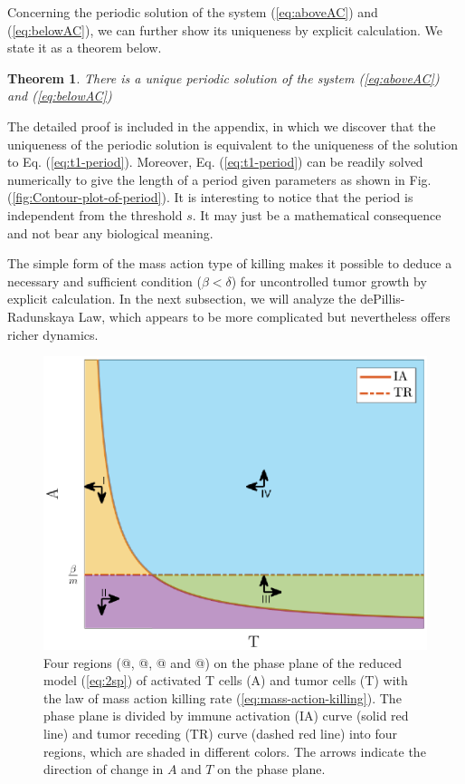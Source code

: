 \documentclass[review,authoryear]{elsarticle}
\makeatletter
\newtheorem{theorem}{Theorem}
\newcommand*{\rom}[1]{\expandafter\@slowromancap\romannumeral #1@}
\makeatother
\begin{document}
Concerning the periodic solution of the system (\ref{eq:aboveAC}) and (\ref{eq:belowAC}), we can further show its uniqueness by explicit calculation. We state it as a theorem below.  
\begin{theorem} \label{thm:unique}
There is a unique periodic solution of the system (\ref{eq:aboveAC}) and (\ref{eq:belowAC})
\end{theorem}
 The detailed proof is included in the appendix, in which we discover that the uniqueness of the periodic solution is equivalent to the uniqueness of the solution to Eq. (\ref{eq:t1-period}). Moreover, Eq. (\ref{eq:t1-period}) can be readily
solved numerically to give the length of a period given parameters
as shown in Fig. (\ref{fig:Contour-plot-of-period}). It is interesting
to notice that the period is independent from the threshold $s$.
It may just be a mathematical consequence and not bear any biological
meaning. 

The simple form of the mass action type of killing makes it possible to deduce a necessary and sufficient condition ($\beta<\delta$) for uncontrolled tumor growth by explicit calculation. In the next subsection, we will analyze the dePillis-Radunskaya Law, which appears to be more complicated but nevertheless offers richer dynamics.  

\begin{figure}
\centerline{\includegraphics[width=1\linewidth]{figs/DA-colored-regions}}

\caption{Four regions (\rom{1}, \rom{2}, \rom{3} and \rom{4}) on the phase plane of the reduced model (\ref{eq:2sp}) of activated T cells (A) and tumor cells (T) with the law of mass action killing rate (\ref{eq:mass-action-killing}). The phase plane is divided by immune activation (IA) curve (solid red line) and tumor receding (TR) curve (dashed red line) into four regions, which are 
shaded in different colors. The arrows indicate the direction of change in $A$ and $T$ on the phase plane. \label{fig:DA-PP-4regions}}
\end{figure}
\end{document}
